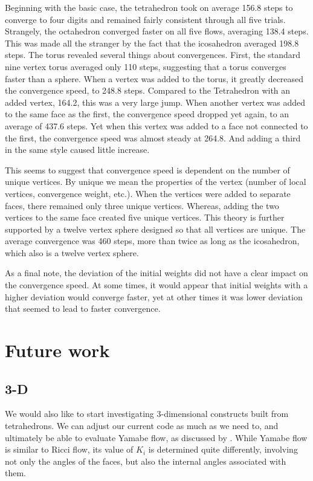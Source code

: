 \documentclass[12pt]{article}
\begin{document}
\noindent Beginning with the basic case, the tetrahedron took on average 156.8 steps to converge to four digits and remained fairly consistent through all five trials. Strangely, the octahedron converged faster on all five flows, averaging 138.4 steps. This was made all the stranger by the fact that the icosahedron averaged 198.8 steps. The torus revealed several things about convergences. First, the standard nine vertex torus averaged only 110 steps, suggesting that a torus converges faster than a sphere. When a vertex was added to the torus, it greatly decreased the convergence speed, to 248.8 steps. Compared to the Tetrahedron with an added vertex, 164.2, this was a very large jump. When another vertex was added to the same face as the first, the convergence speed dropped yet again, to an average of 437.6 steps. Yet when this vertex was added to a face not connected to the first, the convergence speed was almost steady at 264.8. And adding a third in the same style caused little increase.\newline

\noindent This seems to suggest that convergence speed is dependent on the number of unique vertices. By unique we mean the properties of the vertex (number of local vertices, convergence weight, etc.). When the vertices were added to separate faces, there remained only three unique vertices. Whereas, adding the two vertices to the same face created five unique vertices. This theory is further supported by a twelve vertex sphere designed so that all vertices are unique. The average convergence was 460 steps, more than twice as long as the icosahedron, which also is a twelve vertex sphere.\newline

\noindent As a final note, the deviation of the initial weights did not have a clear impact on the convergence speed. At some times, it would appear that initial weights with a higher deviation would converge faster, yet at other times it was lower deviation that seemed to lead to faster convergence.

\section{Future work}
\subsection{3-D}

We would also like to start investigating 3-dimensional constructs built from tetrahedrons. We can adjust our current code as much as we need to, and ultimately be able to evaluate Yamabe flow, as discussed by \cite{DrG}. While Yamabe flow is similar to Ricci flow, its value of $K_i$ is determined quite differently, involving not only the angles of the faces, but also the internal angles associated with them.\newline
\end{document}
